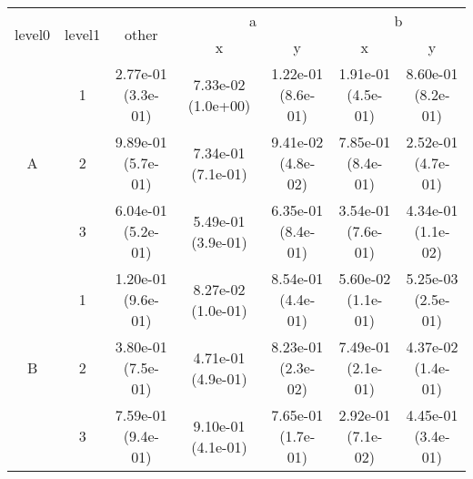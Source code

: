 \begin{tabular}{ccccccc}
\toprule
\multirow{2}{*}{level0} & \multirow{2}{*}{level1}& \multirow{2}{*}{other}&\multicolumn{2}{c}{a}&\multicolumn{2}{c}{b}\tabularnewline
\cmidrule(lr){4-5}
\cmidrule(lr){6-7}
&&&x&y&x&y\tabularnewline
\midrule
\multirow{3}{*}{A}&1& 2.77e-01 (3.3e-01)& 7.33e-02 (1.0e+00)& 1.22e-01 (8.6e-01)& 1.91e-01 (4.5e-01)& 8.60e-01 (8.2e-01)\tabularnewline
&2& 9.89e-01 (5.7e-01)& 7.34e-01 (7.1e-01)& 9.41e-02 (4.8e-02)& 7.85e-01 (8.4e-01)& 2.52e-01 (4.7e-01)\tabularnewline
&3& 6.04e-01 (5.2e-01)& 5.49e-01 (3.9e-01)& 6.35e-01 (8.4e-01)& 3.54e-01 (7.6e-01)& 4.34e-01 (1.1e-02)\tabularnewline
\midrule
\multirow{3}{*}{B}&1& 1.20e-01 (9.6e-01)& 8.27e-02 (1.0e-01)& 8.54e-01 (4.4e-01)& 5.60e-02 (1.1e-01)& 5.25e-03 (2.5e-01)\tabularnewline
&2& 3.80e-01 (7.5e-01)& 4.71e-01 (4.9e-01)& 8.23e-01 (2.3e-02)& 7.49e-01 (2.1e-01)& 4.37e-02 (1.4e-01)\tabularnewline
&3& 7.59e-01 (9.4e-01)& 9.10e-01 (4.1e-01)& 7.65e-01 (1.7e-01)& 2.92e-01 (7.1e-02)& 4.45e-01 (3.4e-01)\tabularnewline
\bottomrule
\end{tabular}
